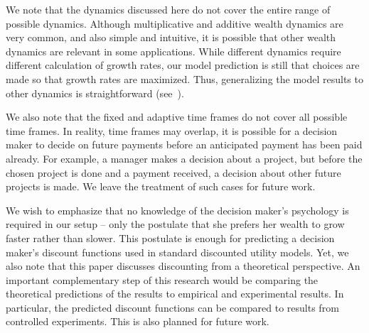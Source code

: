 We note that the dynamics discussed here do not cover the entire range of possible dynamics. Although multiplicative and additive wealth dynamics are very common, and also simple and intuitive, it is possible that other wealth dynamics are relevant in some applications. While different dynamics require different calculation of growth rates, our model prediction is still that choices are made so that growth rates are maximized. Thus, generalizing the model results to other dynamics is straightforward (see~\citet{PetersGell-Mann2016,PetersAdamou2018a}).

We also note that the fixed and adaptive time frames do not cover all possible time frames. In reality, time frames may overlap, \ie it is possible for a decision maker to decide on future payments before an anticipated payment has been paid already. For example, a manager makes a decision about a project, but before the chosen project is done and a payment received, a decision about other future projects is made. We leave the treatment of such cases for future work.

We wish to emphasize that no knowledge of the decision maker's psychology is required in our setup -- only the postulate that she prefers her wealth to grow faster rather than slower. This postulate is enough for predicting a decision maker's discount functions used in standard discounted utility models. Yet, we also note that this paper discusses discounting from a theoretical perspective. An important complementary step of this research would be comparing the theoretical predictions of the results to empirical and experimental results. In particular, the predicted discount functions can be compared to results from controlled experiments. This is also planned for future work.


